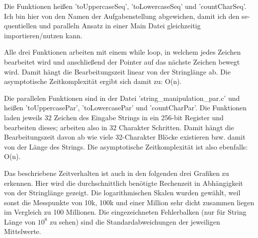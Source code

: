 \documentclass[plainarticle,zihtitle,german,final,hyperref,utf8]{zihpub}
\begin{document}
Die Funktionen heißen 'toUppercaseSeq', 'toLowercaseSeq' und 'countCharSeq'. Ich bin hier von den Namen der Aufgabenstellung abgewichen, damit ich den se­quen­ti­ellen und paralleln Ansatz in einer Main Datei gleichzeitig importieren/nutzen kann.

Alle drei Funktionen arbeiten mit einem while loop, in welchem jedes Zeichen bearbeitet wird und anschließend der Pointer auf das nächste Zeichen bewegt wird. Damit hängt die Bearbeitungszeit linear von der Stringlänge ab. Die asymptotische Zeitkomplexität ergibt sich damit zu: O(n).
\newline

Die parallelen Funktionen sind in der Datei 'string\_manipulation\_par.c' und heißen 'toUppercasePar', 'toLowercasePar' und 'countCharPar'.
Die Funktionen laden jeweils 32 Zeichen des Eingabe Strings in ein 256-bit Register und bearbeiten dieses; arbeiten also in 32 Charakter Schritten.
Damit hängt die Bearbeitungszeit davon ab wie viele 32-Charakter Blöcke existieren bzw. damit von der Länge des Strings. Die asymptotische Zeitkomplexität ist also ebenfalls: O(n).
\newline

Das beschriebene Zeitverhalten ist auch in den folgenden drei Grafiken zu erkennen.
Hier wird die durchschnittlich benötigte Rechenzeit in Abhängigkeit von der Stringlänge gezeigt.
Die logarithmischen Skalen wurden gewählt, weil sonst die Messpunkte von 10k, 100k und einer Million sehr dicht zusammen liegen im Vergleich zu 100 Millionen.
Die eingezeichneten Fehlerbalken (nur für String Länge von \begin{math}10^8\end{math} zu sehen) sind die Standardabweichungen der jeweiligen Mittelwerte.
\end{document}
